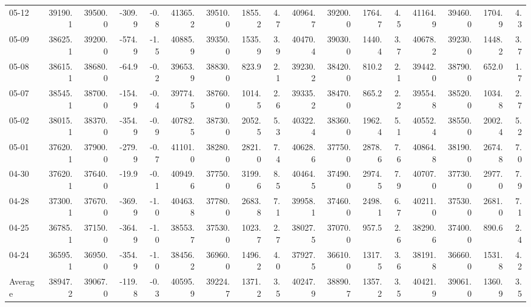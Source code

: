 \begin{threeparttable}
{\begin{tabular}{lrrrrrrrrrrrrrrrr}
  05-12 & 39190.1 & 39500.0 &     -309.9 &           -0.8 & 41365.2 & 39510.0 &     1855.2 &            4.7 & 40964.7 & 39200.0 &     1764.7 &            4.5 & 41164.9 & 39460.0 &      1704.9 &              4.3 \\
  05-09 & 38625.1 & 39200.0 &     -574.9 &           -1.5 & 40885.9 & 39350.0 &     1535.9 &            3.9 & 40470.4 & 39030.0 &     1440.4 &            3.7 & 40678.2 & 39230.0 &      1448.2 &              3.7 \\
  05-08 & 38615.1 & 38680.0 &      -64.9 &           -0.2 & 39653.9 & 38830.0 &      823.9 &            2.1 & 39230.2 & 38420.0 &      810.2 &            2.1 & 39442.0 & 38790.0 &       652.0 &              1.7 \\
  05-07 & 38545.1 & 38700.0 &     -154.9 &           -0.4 & 39774.5 & 38760.0 &     1014.5 &            2.6 & 39335.2 & 38470.0 &      865.2 &            2.2 & 39554.8 & 38520.0 &      1034.8 &              2.7 \\
  05-02 & 38015.1 & 38370.0 &     -354.9 &           -0.9 & 40782.5 & 38730.0 &     2052.5 &            5.3 & 40322.4 & 38360.0 &     1962.4 &            5.1 & 40552.4 & 38550.0 &      2002.4 &              5.2 \\
  05-01 & 37620.1 & 37900.0 &     -279.9 &           -0.7 & 41101.0 & 38280.0 &     2821.0 &            7.4 & 40628.6 & 37750.0 &     2878.6 &            7.6 & 40864.8 & 38190.0 &      2674.8 &              7.0 \\
  04-30 & 37620.1 & 37640.0 &      -19.9 &           -0.1 & 40949.6 & 37750.0 &     3199.6 &            8.5 & 40464.5 & 37490.0 &     2974.5 &            7.9 & 40707.0 & 37730.0 &      2977.0 &              7.9 \\
  04-28 & 37300.1 & 37670.0 &     -369.9 &           -1.0 & 40463.8 & 37780.0 &     2683.8 &            7.1 & 39958.1 & 37460.0 &     2498.1 &            6.7 & 40211.0 & 37530.0 &      2681.0 &              7.1 \\
  04-25 & 36785.1 & 37150.0 &     -364.9 &           -1.0 & 38553.7 & 37530.0 &     1023.7 &            2.7 & 38027.5 & 37070.0 &      957.5 &            2.6 & 38290.6 & 37400.0 &       890.6 &              2.4 \\
  04-24 & 36595.1 & 36950.0 &     -354.9 &           -1.0 & 38456.2 & 36960.0 &     1496.2 &            4.0 & 37927.5 & 36610.0 &     1317.5 &            3.6 & 38191.8 & 36660.0 &      1531.8 &              4.2 \\
Average & 38947.2 & 39067.0 &     -119.8 &           -0.3 & 40595.9 & 39224.7 &     1371.2 &            3.5 & 40247.9 & 38890.7 &     1357.2 &            3.5 & 40421.9 & 39061.0 &      1360.9 &              3.5 \\

\end{tabular}}
\end{threeparttable}
